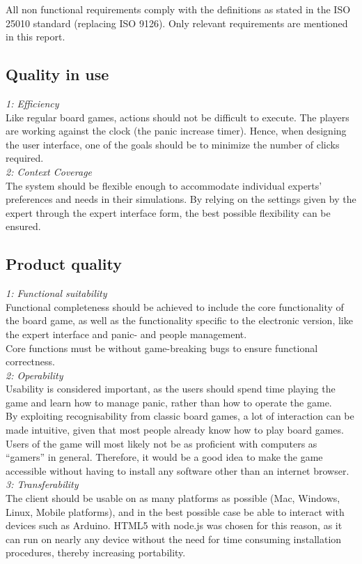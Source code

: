 All non functional requirements comply with the definitions as stated in the ISO 25010 standard (replacing ISO 9126). Only relevant requirements are mentioned in this report.

\subsection{Quality in use}

\emph{1: Efficiency}\\
Like regular board games, actions should not be difficult to execute. The players are working against the clock (the panic increase timer). Hence, when designing the user interface, one of the goals should be to minimize the number of clicks required.
\\\newline
\emph{2: Context Coverage}\\
The system should be flexible enough to accommodate individual experts’ preferences and needs in their simulations. By relying on the settings given by the expert through the expert interface form, the best possible flexibility can be ensured.

\subsection{Product quality}

\emph{1: Functional suitability}\\
Functional completeness should be achieved to include the core functionality 
of the board game, as well as the functionality specific to the electronic 
version, like the expert interface and panic- and people management. 
\\
Core functions must be without game-breaking bugs to ensure functional 
correctness.
\\\newline
\emph{2: Operability}\\
Usability is considered important, as the users should spend time playing the 
game and learn how to manage panic, rather than how to operate the game. 
\\
By exploiting recognisability from classic board games, a lot of interaction 
can be made intuitive, given that most people already know how to play board 
games. 
\\
Users of the game will most likely not be as proficient with computers as 
“gamers” in general. Therefore, it would be a good idea to make the game 
accessible without having to install any software other than an internet browser.
\\\newline
\emph{3: Transferability}\\
The client should be usable on as many platforms as possible (Mac, Windows, 
Linux, Mobile platforms), and in the best possible case be able to interact 
with devices such as Arduino. HTML5 with node.js was chosen for this reason, as 
it can run on nearly any device without the need for time consuming 
installation procedures, thereby increasing portability.


